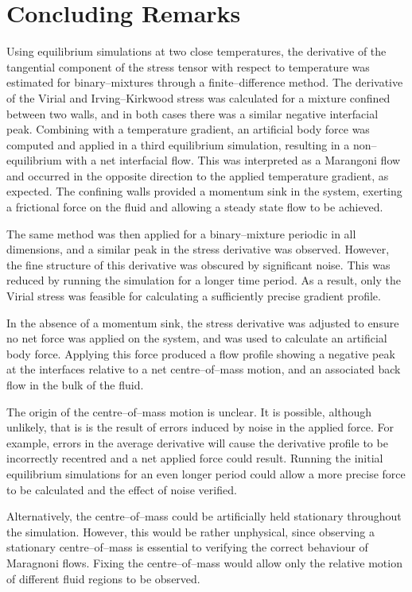 \section{Concluding Remarks}
Using equilibrium simulations at two close temperatures, the derivative of the tangential component of the stress tensor with respect to temperature was estimated for binary--mixtures through a finite--difference method.
The derivative of the Virial and Irving--Kirkwood stress was calculated for a mixture confined between two walls, and in both cases there was a similar negative interfacial peak.
Combining with a temperature gradient, an artificial body force was computed and applied in a third equilibrium simulation, resulting in a non--equilibrium with a net interfacial flow.
This was interpreted as a Marangoni flow and occurred in the opposite direction to the applied temperature gradient, as expected.
The confining walls provided a momentum sink in the system, exerting a frictional force on the fluid and allowing a steady state flow to be achieved.

The same method was then applied for a binary--mixture periodic in all dimensions, and a similar peak in the stress derivative was observed.
However, the fine structure of this derivative was obscured by significant noise.
This was reduced by running the simulation for a longer time period.
As a result, only the Virial stress was feasible for calculating a sufficiently precise gradient profile.

In the absence of a momentum sink, the stress derivative was adjusted to ensure no net force was applied on the system, and was used to calculate an artificial body force.
Applying this force produced a flow profile showing a negative peak at the interfaces relative to a net centre--of--mass motion, and an associated back flow in the bulk of the fluid.

The origin of the centre--of--mass motion is unclear. 
It is possible, although unlikely, that is is the result of errors induced by noise in the applied force.
For example, errors in the average derivative will cause the derivative profile to be incorrectly recentred and a net applied force could result.
Running the initial equilibrium simulations for an even longer period could allow a more precise force to be calculated and the effect of noise verified. 

Alternatively, the centre--of--mass could be artificially held stationary throughout the simulation.
However, this would be rather unphysical, since observing a stationary centre--of--mass is essential to verifying the correct behaviour of Maragnoni flows.
Fixing the centre--of--mass would allow only the relative motion of different fluid regions to be observed.

